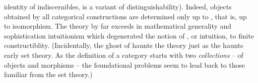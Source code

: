 identity of indiscernibles, is a variant of distinguishability).  Indeed,
objects obtained by all categorical constructions are determined only up to
, that is, up to isomorphism.  The theory by far exceeds in mathematical generality and
sophistication intuitionism which degenerated the notion of ,
or intuition, to finite constructiblity.  (Incidentally, the ghost of
 haunts the theory just as the  haunts early set theory. As the definition of a category starts with two
{\em collections} -- of objects and morphisms -- the foundational problems seem
to lead back to those familiar from the set theory.)



